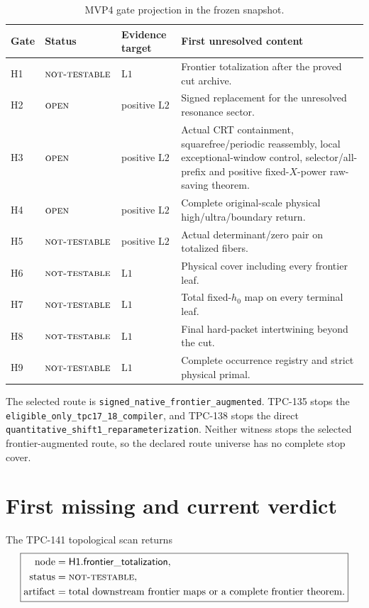 \documentclass[11pt]{article}
\theoremstyle{definition}
\theoremstyle{remark}
\newcommand{\NT}{\textnormal{\textsc{not-testable}}}
\newcommand{\OPEN}{\textnormal{\textsc{open}}}
\newcommand{\Lone}{\mathrm{L1}}
\newcommand{\Ltwo}{\mathrm{L2}}
\begin{document}
\begin{table}[htbp]
\centering
\small
\caption{MVP4 gate projection in the frozen snapshot.}
\label{tab:gates}
\begin{tabularx}{\textwidth}{@{}P{0.07\textwidth}P{0.18\textwidth}
P{0.18\textwidth}Y@{}}
\toprule
Gate & Status & Evidence target & First unresolved content\\
\midrule
H1 & \(\NT\) & \(\Lone\) &
Frontier totalization after the proved cut archive.\\
H2 & \(\OPEN\) & positive \(\Ltwo\) &
Signed replacement for the unresolved resonance sector.\\
H3 & \(\OPEN\) & positive \(\Ltwo\) &
Actual CRT containment, squarefree/periodic reassembly,
local exceptional-window control, selector/all-prefix and positive
fixed-\(X\)-power raw-saving theorem.\\
H4 & \(\OPEN\) & positive \(\Ltwo\) &
Complete original-scale physical high/ultra/boundary return.\\
H5 & \(\NT\) & positive \(\Ltwo\) &
Actual determinant/zero pair on totalized fibers.\\
H6 & \(\NT\) & \(\Lone\) &
Physical cover including every frontier leaf.\\
H7 & \(\NT\) & \(\Lone\) &
Total fixed-\(h_0\) map on every terminal leaf.\\
H8 & \(\NT\) & \(\Lone\) &
Final hard-packet intertwining beyond the cut.\\
H9 & \(\NT\) & \(\Lone\) &
Complete occurrence registry and strict physical primal.\\
\bottomrule
\end{tabularx}
\end{table}

The selected route is
\nolinkurl{signed_native_frontier_augmented}.  TPC-135 stops the
\nolinkurl{eligible_only_tpc17_18_compiler}, and TPC-138 stops
the direct \nolinkurl{quantitative_shift1_reparameterization}.  Neither
witness stops the selected frontier-augmented route, so the declared
route universe has no complete stop cover.

\section{First missing and current verdict}

The TPC-141 topological scan returns
\[
\boxed{
\begin{aligned}
\mathrm{node}&=\mathsf{H1.frontier\_totalization},\\
\mathrm{status}&=\NT,\\
\mathrm{artifact}&=
\text{total downstream frontier maps or a complete frontier theorem}.
\end{aligned}}
\]
\end{document}
